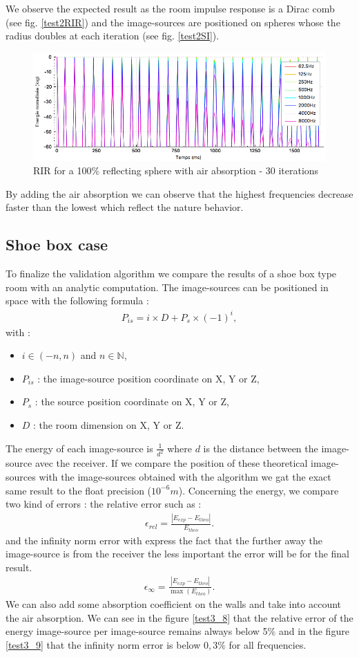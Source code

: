 \documentclass[AMA,STIX1COL]{WileyNJD-v2}
\begin{document}
%
We observe the expected result as the room impulse response is a Dirac comb (see fig. \ref{test2RIR}) and the image-sources are positioned on spheres whose the radius doubles at each iteration (see fig. \ref{test2SI}).
%
\begin{figure}
\centering
	\includegraphics[width=0.6\linewidth]{test2absair}
	\caption{RIR for a 100\% reflecting sphere with air absorption - 30 iterations}
	\label{test2absair}
\end{figure}
%
By adding the air absorption we can observe that the highest frequencies decrease faster than the lowest which reflect the nature behavior.

\subsection{Shoe box case}
To finalize the validation algorithm we compare the results of a shoe box type room with an analytic computation. The image-sources can be positioned in space with the following formula :
\begin{align}
P_{is} = i \times D + P_s \times (-1)^i,
\end{align}
with : 
\begin{itemize}
\item$i \in (-n, n)$ and $n \in \mathbb{N}$,
\item$P_{is}$ : the image-source position coordinate on X, Y or Z,
\item$P_s$ : the source position coordinate on X, Y or Z,
\item$D$ : the room dimension on X, Y or Z.
\end{itemize}
The energy of each image-source is $\frac{1}{d^2}$ where $d$ is the distance between the image-source avec the receiver. If we compare the position of these theoretical image-sources with the image-sources obtained with the algorithm we gat the exact same result to the float precision ($10^{-6}m$). Concerning the energy, we compare two kind of errors : the relative error such as :
\begin{align}
\epsilon_{rel} = \frac{|E_{exp}-E_{theo}|}{E_{theo}}.
\end{align}
and the infinity norm error with express the fact that the further away the image-source is from the receiver the less important the error will be for the final result.
\begin{align}
\epsilon_{\infty} = \frac{|E_{exp}-E_{theo}|}{\max(E_{theo})}.
\end{align}
We can also add some absorption coefficient on the walls and take into account the air absorption. We can see in the figure \ref{test3_8} that the relative error of the energy image-source per image-source remains always below 5\% and in the figure \ref{test3_9} that the infinity norm error is below $0,3\%$ for all frequencies.
\end{document}
